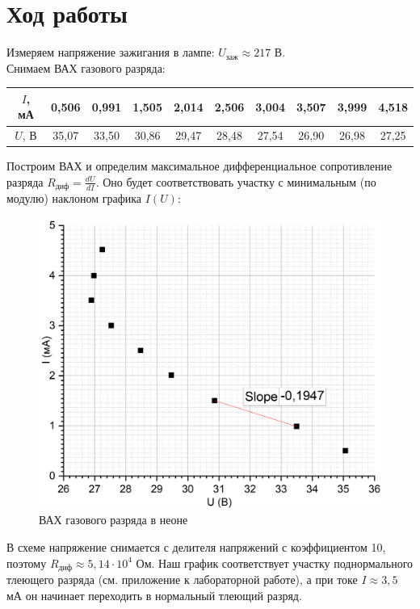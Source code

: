 \documentclass[a4paper, 12pt]{article}
\begin{document}
	\section*{Ход работы}
	Измеряем напряжение зажигания в лампе: $U_{\text{заж}} \approx 217 $ В.\\
	Снимаем ВАХ газового разряда:
	\begin{table}[h!]
		\centering
		\begin{tabular}{|c|c|c|c|c|c|c|c|c|c|}
			\hline
			$I$, мА & 0,506 & 0,991 & 1,505 & 2,014 & 2,506 & 3,004 & 3,507 & 3,999 & 4,518 \\ \hline
			$U$, В & 35,07 & 33,50 & 30,86 & 29,47 & 28,48 & 27,54 & 26,90 & 26,98 & 27,25 \\ \hline
		\end{tabular}
	\end{table}
	
	Построим ВАХ и определим максимальное дифференциальное сопротивление разряда $R_{\text{диф}} = \frac{dU}{dI}$. Оно будет соответствовать участку с минимальным (по модулю) наклоном графика $I(U)$:
	
	\begin{figure}[h!]
		\centering
		\includegraphics[width = \textwidth]{VAH1}
		\caption{ВАХ газового разряда в неоне}
	\end{figure}
	В схеме напряжение снимается с делителя напряжений с коэффициентом 10, поэтому $R_{\text{диф}} \approx 5,14 \cdot 10^4$ Ом. Наш график соответствует участку поднормального тлеющего разряда (см. приложение к лабораторной работе), а при токе $I \approx 3,5$ мА он начинает переходить в нормальный тлеющий разряд.
	
\end{document}
